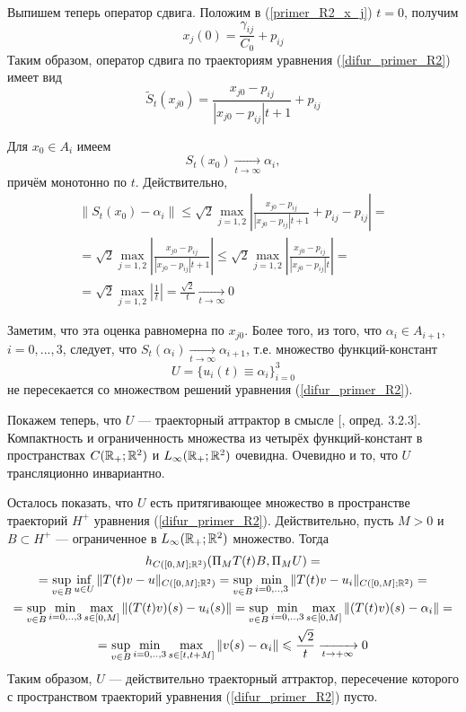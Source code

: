 Выпишем теперь оператор сдвига.
Положим в (\ref{primer_R2_x_j}) $t=0$, получим
$$
	x_j(0) = \frac{\gamma_{ij}}{C_0}+p_{ij}
$$
Таким образом, оператор сдвига по траекториям уравнения (\ref{difur_primer_R2}) имеет вид
\begin{equation}\label{primer_R2_oper_sdviga}
	\tilde{S}_t(x_{j0}) = \frac{x_{j0}-p_{ij}}{|x_{j0}-p_{ij}|t+1}+p_{ij}
\end{equation}

Для $x_0 \in A_i$ имеем
\begin{equation}\label{primer_R2_stremlenie}
	S_t(x_0) \xrightarrow[t \to \infty]{} \alpha_{i},
\end{equation}
причём монотонно по $t$.
Действительно,
\begin{multline}
	\|S_t(x_0) - \alpha_i\| \leq
	\sqrt{2} \max_{j=1,2} \left| \frac{x_{j0}-p_{ij}}{|x_{j0}-p_{ij}|t+1} + p_{ij} - p_{ij}  \right| = \\ =
	\sqrt{2} \max_{j=1,2} \left| \frac{x_{j0}-p_{ij}}{|x_{j0}-p_{ij}|t+1} \right| \leq
	\sqrt{2} \max_{j=1,2} \left| \frac{x_{j0}-p_{ij}}{|x_{j0}-p_{ij}|t} \right| =
	\\ =
	\sqrt{2} \max_{j=1,2} \left| \frac{1}{t} \right| =
	\frac{\sqrt{2}}{t} \xrightarrow[t \to \infty]{} 0
\end{multline}

Заметим, что эта оценка равномерна по $x_{j0}$.
Более того, из того, что $\alpha_i \in A_{i+1}$, $i=0,...,3$,
следует, что $S_t(\alpha_i) \xrightarrow[t \to \infty]{} \alpha_{i+1}$,
т.е. множество функций-констант
$$
	U = \{ u_i(t) \equiv \alpha_i \}_{i=0}^{3}
$$
не пересекается со множеством решений уравнения (\ref{difur_primer_R2}).

Покажем теперь, что $U$ --- траекторный аттрактор в смысле [\cite{Zelenaya}, опред. 3.2.3].
Компактность и ограниченность множества из четырёх функций-констант в пространствах
$C(\mathbb{R}_+; \mathbb{R}^2)$ и $L_\infty(\mathbb{R}_+; \mathbb{R}^2)$ очевидна.
Очевидно и то, что $U$ трансляционно инвариантно.

Осталось показать, что $U$ есть притягивающее множество в пространстве траекторий $H^+$ уравнения (\ref{difur_primer_R2}).
Действительно, пусть $M>0$ и $B\subset H^+$ --- ограниченное в $L_\infty(\mathbb{R}_+; \mathbb{R}^2)$ множество.
Тогда
\begin{multline*}
	h_{C([0,M];\mathbb{R}^2)}(\Pi_M T(t)B,\Pi_M U) =
	\\ =
	\sup_{v\in B} \inf_{u\in U} \| T(t) v - u \|_{C([0,M];\mathbb{R}^2)} =
	\sup_{v\in B} \min_{i=0,..,3} \| T(t) v - u_i \|_{C([0,M];\mathbb{R}^2)} =
	\\ =
	\sup_{v\in B} \min_{i=0,..,3} \max_{s\in[0,M]} \| (T(t) v)(s) - u_i(s) \| =
	\sup_{v\in B} \min_{i=0,..,3} \max_{s\in[0,M]} \| (T(t) v)(s) - \alpha_i \| =
	\\ =
	\sup_{v\in B} \min_{i=0,..,3} \max_{s\in[t,t+M]} \| v(s) - \alpha_i \| \leqslant
	\frac{\sqrt{2}}{t} \xrightarrow[t\to + \infty]{} 0
\end{multline*}
Таким образом, $U$ --- действительно траекторный аттрактор, пересечение которого с пространством траекторий
уравнения (\ref{difur_primer_R2}) пусто.

